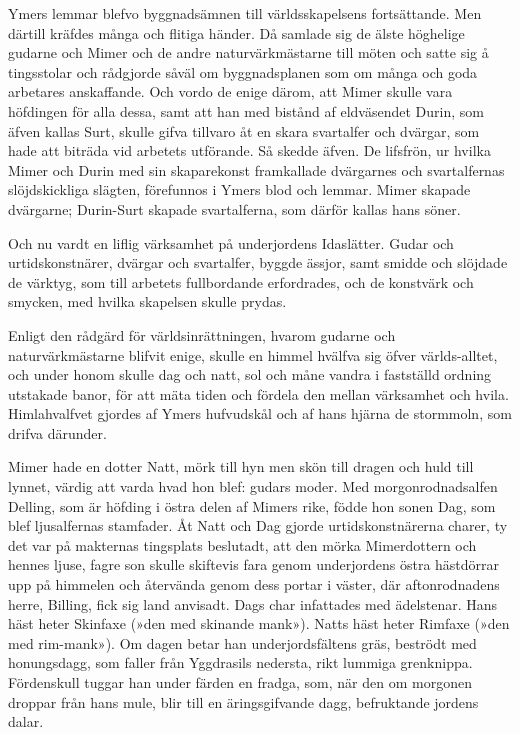 Ymers lemmar blefvo byggnadsämnen till världsskapelsens fortsättande.
Men därtill kräfdes många och flitiga händer. Då samlade sig de älste
höghelige gudarne och Mimer och de andre naturvärkmästarne till möten
och satte sig å tingsstolar och rådgjorde såväl om byggnadsplanen som om
många och goda arbetares anskaffande. Och vordo de enige därom, att
Mimer skulle vara höfdingen för alla dessa, samt att han med bistånd af
eldväsendet Durin, som äfven kallas Surt, skulle gifva tillvaro åt en
skara svartalfer och dvärgar,
\protect\hypertarget{lb1625905.xhtmlux5cux23start9}{}{}\protect\hypertarget{lb1625905.xhtmlux5cux23start9-a}{}{}\protect\hypertarget{lb1625905.xhtmlux5cux23start9-b}{}{}\protect\hypertarget{lb1625905.xhtmlux5cux23start9-c}{}{}\protect\hypertarget{lb1625905.xhtmlux5cux23start9-d}{}{}
som hade att biträda vid arbetets utförande. Så skedde äfven. De
lifsfrön, ur hvilka Mimer och Durin med sin skaparekonst framkallade
dvärgarnes och svartalfernas slöjdskickliga slägten, förefunnos i Ymers
blod och lemmar. Mimer skapade dvärgarne; Durin-Surt skapade
svartalferna, som därför kallas hans söner.

Och nu vardt en liflig värksamhet på underjordens Idaslätter. Gudar och
urtidskonstnärer, dvärgar och svartalfer, byggde ässjor, samt smidde och
slöjdade de värktyg, som till arbetets fullbordande erfordrades, och de
konstvärk och smycken, med hvilka skapelsen skulle prydas.

Enligt den rådgärd för världsinrättningen, hvarom gudarne och
naturvärkmästarne blifvit enige, skulle en himmel hvälfva sig öfver
världs-alltet, och under honom skulle dag och natt, sol och måne vandra
i fastställd ordning utstakade banor, för att mäta tiden och fördela den
mellan värksamhet och hvila. Himlahvalfvet gjordes af Ymers hufvudskål
och af hans hjärna de stormmoln, som drifva därunder.

Mimer hade en dotter Natt, mörk till hyn men skön till dragen och huld
till lynnet, värdig att varda hvad hon blef: gudars moder. Med
morgonrodnadsalfen Delling, som är höfding i östra delen af Mimers rike,
födde hon sonen Dag, som blef ljusalfernas stamfader. Åt Natt och Dag
gjorde urtidskonstnärerna charer, ty det var på makternas tingsplats
beslutadt, att den mörka Mimerdottern och hennes ljuse, fagre son skulle
skiftevis fara genom underjordens östra hästdörrar upp på himmelen och
återvända genom dess portar i väster, där aftonrodnadens herre, Billing,
fick sig land anvisadt. Dags char infattades med ädelstenar. Hans häst
heter Skinfaxe (»den med skinande mank»). Natts häst heter Rimfaxe (»den
med rim-mank»). Om dagen betar han underjordsfältens gräs, beströdt med
honungsdagg, som faller från Yggdrasils nedersta, rikt lummiga
grenknippa. Fördenskull tuggar han under färden en fradga, som, när den
om morgonen droppar från hans mule, blir till en äringsgifvande dagg,
befruktande jordens dalar.

